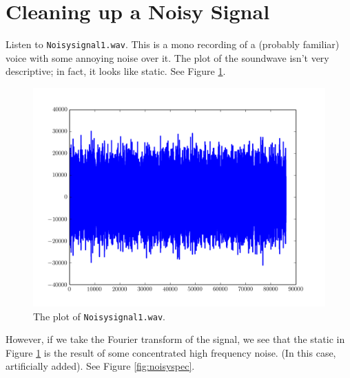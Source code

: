 

\section*{Cleaning up a Noisy Signal}

Listen to \texttt{Noisysignal1.wav}.
This is a mono recording of a (probably familiar) voice with some annoying noise over it.
The plot of the soundwave isn't very descriptive; in fact, it looks like static.
See Figure \ref{fig:noisysignal}.

\begin{figure}
\centering
\includegraphics[width=\textwidth]{noisy}
\caption{The plot of \texttt{Noisysignal1.wav}.}
\label{fig:noisysignal}
\end{figure}

However, if we take the Fourier transform of the signal, we see that the static in Figure \ref{fig:noisysignal} is the result of some concentrated high frequency noise.
(In this case, artificially added).
See Figure \ref{fig:noisyspec}.

